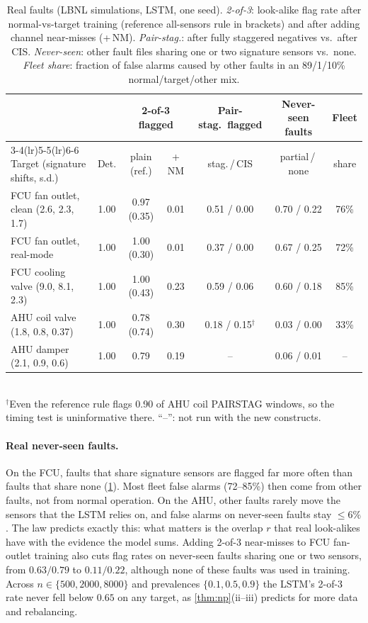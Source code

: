\documentclass{article}
\theoremstyle{definition}
\theoremstyle{remark}
\renewcommand{\1}{\mathbf{1}}
\begin{document}
\begin{table}[t]
\centering
\caption{Real faults (LBNL simulations, LSTM, one seed). \emph{2-of-3}: look-alike flag rate after normal-vs-target training (reference all-sensors rule in brackets) and after adding channel near-misses (+\,NM). \emph{Pair-stag.}: after fully staggered negatives vs.\ after CIS. \emph{Never-seen}: other fault files sharing one or two signature sensors vs.\ none. \emph{Fleet share}: fraction of false alarms caused by other faults in an 89/1/10\% normal/target/other mix.}
\label{tab:real}
\small
\setlength{\tabcolsep}{3.2pt}
\begin{tabular}{@{}lcccccc@{}}
\toprule
 & & \multicolumn{2}{c}{2-of-3 flagged} & Pair-stag.\ flagged & Never-seen faults & Fleet\\
\cmidrule(lr){3-4}\cmidrule(lr){5-5}\cmidrule(lr){6-6}
Target (signature shifts, s.d.) & Det. & plain (ref.) & + NM & stag.\,/\,CIS & partial\,/\,none & share\\
\midrule
FCU fan outlet, clean (2.6, 2.3, 1.7) & 1.00 & 0.97 (0.35) & 0.01 & 0.51 / 0.00 & 0.70 / 0.22 & 76\% \\
FCU fan outlet, real-mode & 1.00 & 1.00 (0.30) & 0.01 & 0.37 / 0.00 & 0.67 / 0.25 & 72\% \\
FCU cooling valve (9.0, 8.1, 2.3) & 1.00 & 1.00 (0.43) & 0.23 & 0.59 / 0.06 & 0.60 / 0.18 & 85\% \\
AHU coil valve (1.8, 0.8, 0.37) & 1.00 & 0.78 (0.74) & 0.30 & 0.18 / 0.15$^\dagger$ & 0.03 / 0.00 & 33\% \\
AHU damper (2.1, 0.9, 0.6) & 1.00 & 0.79 & 0.19 & -- & 0.06 / 0.01 & -- \\
\bottomrule
\end{tabular}\\[2pt]
{\footnotesize $^\dagger$Even the reference rule flags 0.90 of AHU coil PAIRSTAG windows, so the timing test is uninformative there. ``--'': not run with the new constructs.}
\end{table}

\paragraph{Real never-seen faults.} On the FCU, faults that share signature sensors are flagged far more often than faults that share none (\cref{tab:real}). Most fleet false alarms (72--85\%) then come from other faults, not from normal operation. On the AHU, other faults rarely move the sensors that the LSTM relies on, and false alarms on never-seen faults stay $\le6\%$. The law predicts exactly this: what matters is the overlap $r$ that real look-alikes have with the evidence the model sums. Adding 2-of-3 near-misses to FCU fan-outlet training also cuts flag rates on never-seen faults sharing one or two sensors, from $0.63/0.79$ to $0.11/0.22$, although none of these faults was used in training. Across $n\in\{500,2000,8000\}$ and prevalences $\{0.1,0.5,0.9\}$ the LSTM's 2-of-3 rate never fell below $0.65$ on any target, as \cref{thm:np}(ii--iii) predicts for more data and rebalancing.
\end{document}
